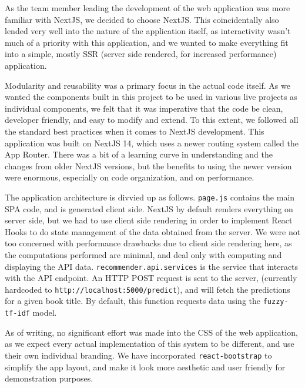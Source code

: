 As the team member leading the development of the web application was more familiar with NextJS, we decided to choose NextJS. This coincidentally also lended very well into the nature of the application itself, as interactivity wasn't much of a priority with this application, and we wanted to make everything fit into a simple, mostly SSR (server side rendered, for increased performance) application.

Modularity and reusability was a primary focus in the actual code itself. As we wanted the components built in this project to be used in various live projects as individual components, we felt that it was imperative that the code be clean, developer friendly, and easy to modify and extend. To this extent, we followed all the standard best practices when it comes to NextJS development. This application was built on NextJS 14, which uses a newer routing system called the App Router. There was a bit of a learning curve in understanding and the changes from older NextJS versions, but the benefits to using the newer version were enormous, especially on code organization, and on performance.

The application architecture is divvied up as follows.
\texttt{page.js} contains the main SPA code, and is generated client side. NextJS by default renders everything on server side, but we had to use client side rendering in order to implement React Hooks to do state management of the data obtained from the server. We were not too concerned with performance drawbacks due to client side rendering here, as the computations performed are minimal, and deal only with computing and displaying the API data.
\texttt{recommender.api.services} is the service that interacts with the API endpoint. An HTTP POST request is sent to the server, (currently hardcoded to \texttt{http://localhost:5000/predict}), and will fetch the predictions for a given book title. By default, this function requests data using the \texttt{fuzzy-tf-idf} model.

As of writing, no significant effort was made into the CSS of the web application, as we expect every actual implementation of this system to be different, and use their own individual branding. We have incorporated \texttt{react-bootstrap} to simplify the app layout, and make it look more aesthetic and user friendly for demonstration purposes.

